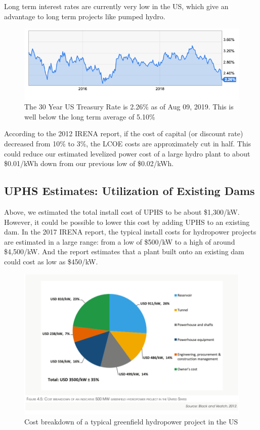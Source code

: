 \documentclass[hidelinks,12pt,a4paper]{article}
\begin{document}
Long term interest rates are currently very low in the US, which give an advantage to long term projects like pumped hydro.

\begin{figure}[ht!]
    \centering
    \includegraphics[width=1\textwidth]{30-year-treasury-rate-226-for-aug-09-2019.png}
    \caption{The 30 Year US Treasury Rate is 2.26\% as of Aug 09, 2019. This is well below the long term average of 5.10\% \cite{30YearTreasuryRateUS}}
\end{figure}
\FloatBarrier

According to the 2012 IRENA report, if the cost of capital (or discount rate) decreased from 10\% to 3\%, the LCOE costs are approximately cut in half. \cite{RenewableEnergyTechnologiesCostAnalysisSeries} This could reduce our estimated levelized power cost of a large hydro plant to about \$0.01/kWh down from our previous low of \$0.02/kWh.

\subsection{UPHS Estimates: Utilization of Existing Dams}
Above, we estimated the total install cost of UPHS to be about \$1,300/kW. However, it could be possible to lower this cost by adding UPHS to an existing dam. In the 2017 IRENA report, the typical install costs for hydropower projects are estimated in a large range: from a low of \$500/kW to a high of around \$4,500/kW. And the report estimates that a plant built onto an existing dam could cost as low as \$450/kW.

\begin{figure}[ht!]
    \centering
    \includegraphics[width=1\textwidth]{cost-breakdown-of-typical-hydro-plant.png}
    \caption{Cost breakdown of a typical greenfield hydropower project in the US \cite{RenewableEnergyTechnologiesCostAnalysisSeries}}
\end{figure}
\FloatBarrier
\end{document}
